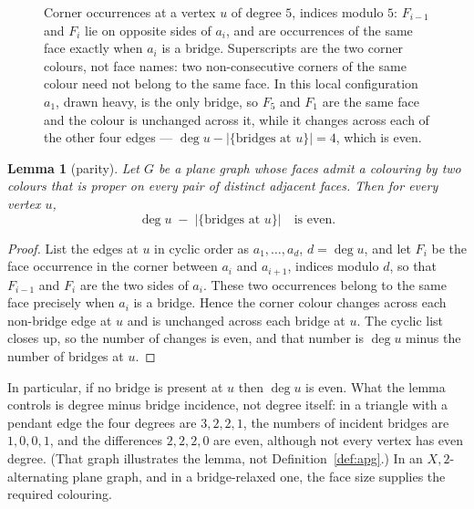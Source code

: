\documentclass{baustms}
\theoremstyle{cupthm}
\newtheorem{lemma}[theorem]{Lemma}
\theoremstyle{cupdefn}
\theoremstyle{cuprem}
\begin{document}
\begin{figure}[ht]
\centering
{}
\caption{Corner occurrences at a vertex $u$ of degree $5$, indices modulo $5$:
$F_{i-1}$ and $F_{i}$ lie on opposite sides of $a_{i}$, and are occurrences of
the same face exactly when $a_{i}$ is a bridge. Superscripts are the two corner
colours, not face names: two non-consecutive corners of the same colour need not
belong to the same face. In this local configuration $a_{1}$, drawn heavy, is the
only bridge, so $F_{5}$ and $F_{1}$ are the same face and the colour is unchanged across it,
while it changes across each of the other four edges ---
$\deg u - |\{\text{bridges at } u\}| = 4$, which is even.}\label{fig:corners}
\end{figure}

\begin{lemma}[parity]\label{lem:parity}
Let $G$ be a plane graph whose faces admit a colouring by two colours that is
proper on every pair of distinct adjacent faces. Then for every vertex $u$,
\[
  \deg u \;-\; \bigl|\{\text{bridges at } u\}\bigr| \quad\text{is even.}
\]
\end{lemma}

\begin{proof}
List the edges at $u$ in cyclic order as $a_1,\dots,a_d$, $d = \deg u$, and let
$F_i$ be the face occurrence in the corner between $a_i$ and $a_{i+1}$, indices
modulo $d$, so that $F_{i-1}$ and $F_i$ are the two sides of $a_i$. These two
occurrences belong to the same face precisely when $a_i$ is a bridge. Hence the
corner colour changes across each non-bridge edge at $u$ and is unchanged across
each bridge at $u$. The cyclic list closes up, so the number of changes is even,
and that number is $\deg u$ minus the number of bridges at $u$.
\end{proof}

In particular, if no bridge is present at $u$ then $\deg u$ is even. What the
lemma controls is degree minus bridge incidence, not degree itself: in a triangle
with a pendant edge the four degrees are $3,2,2,1$, the numbers of incident
bridges are $1,0,0,1$, and the differences $2,2,2,0$ are even, although not every
vertex has even degree. (That graph illustrates the lemma, not
Definition~\ref{def:apg}.) In an $X,2$-alternating plane graph, and in a
bridge-relaxed one, the face size supplies the required colouring.
\end{document}
